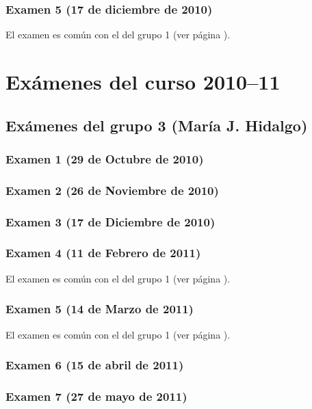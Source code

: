 \documentclass[a4paper,12pt,twoside]{book}
\begin{document}
\subsection{Examen 5 (17 de diciembre de 2010)}
El examen es común con el del grupo 1 (ver página \pageref{examen_09_10_1_9}).

\chapter{Exámenes del curso 2010--11}

\section{Exámenes del grupo 3 (María J. Hidalgo)}
\subsection{Examen 1 (29 de Octubre de 2010)}
\subsection{Examen 2 (26 de Noviembre de 2010)}
\subsection{Examen 3 (17 de Diciembre de 2010)}
\subsection{Examen 4 (11 de Febrero de 2011)}
El examen es común con el del grupo 1 (ver página \pageref{examen_10_11_4_4}).
\subsection{Examen 5 (14 de Marzo de 2011)} 
El examen es común con el del grupo 1 (ver página \pageref{examen_10_11_4_5}).
\subsection{Examen 6 (15 de abril de 2011)}
\subsection{Examen 7 (27 de mayo de 2011)} 
\end{document}
